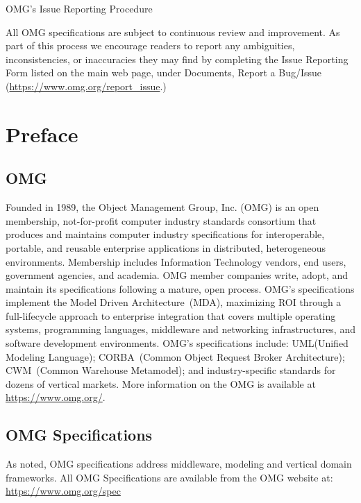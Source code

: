 \begin{center}OMG's Issue Reporting Procedure\end{center}\vspace{-3mm}

All OMG specifications are subject to continuous review and improvement. As part of this process we encourage readers to report any ambiguities, inconsistencies, or inaccuracies they may find by completing the Issue Reporting Form listed on the main web page, under Documents, Report a Bug/Issue ({\url{https://www.omg.org/report\_issue}}.)


\tableofcontents{}
\cleardoublepage
\setcounter{chapter}{-1}
\chapter*{Preface}
\section*{OMG}
Founded in 1989, the Object Management Group, Inc. (OMG) is an open membership, not-for-profit computer industry standards consortium that produces and maintains computer industry specifications for interoperable, portable, and reusable enterprise applications in distributed, heterogeneous environments. Membership includes Information Technology vendors, end users, government agencies, and academia. OMG member companies write, adopt, and maintain its specifications following a mature, open process. OMG's specifications implement the Model Driven Architecture\textregistered\ (MDA\textregistered ), maximizing ROI through a full-lifecycle approach to enterprise integration that covers multiple operating systems, programming languages, middleware and networking infrastructures, and software development environments. OMG's specifications include: UML\textregistered (Unified Modeling Language\texttrademark ); CORBA\textregistered\ (Common Object Request Broker Architecture); CWM\texttrademark\ (Common Warehouse Metamodel); and industry-specific standards for dozens of vertical markets. More information on the OMG is available at \url{https://www.omg.org/}.

\section*{OMG Specifications}
As noted, OMG specifications address middleware, modeling and vertical domain frameworks. All OMG Specifications are available from the OMG website at: \url{https://www.omg.org/spec}

